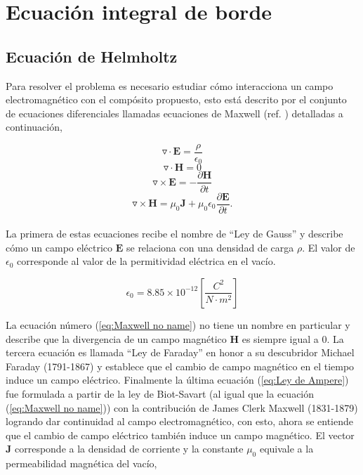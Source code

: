 \documentclass[12pt,letterpaper]{article}
\numberwithin{equation}{section}
\begin{document}
\section{Ecuación integral de borde}

\subsection{Ecuación de Helmholtz}
Para resolver el problema es necesario estudiar cómo interacciona un campo electromagnético con el compósito propuesto, esto está descrito por el conjunto de ecuaciones diferenciales llamadas ecuaciones de Maxwell (ref. \cite{Griffiths}) detalladas a continuación,

\begin{equation}
\triangledown\cdot\textbf{E} = \frac{\rho}{\epsilon_0}
\label{eq:Ley de Gauss}
\end{equation}
\begin{equation}
\triangledown\cdot\textbf{H} = 0
\label{eq:Maxwell no name}
\end{equation}
\begin{equation}
\triangledown\times\textbf{E} = -\frac{\partial\textbf{H}}{\partial t}
\label{eq:Ley de Faraday }
\end{equation}
\begin{equation}
\triangledown\times\textbf{H} = \mu_0 \textbf{J} + \mu_0\epsilon_0\frac{\partial\textbf{E}}{\partial t}.
\label{eq:Ley de Ampere}
\end{equation}
\\

La primera de estas ecuaciones recibe el nombre de ``Ley de Gauss'' y describe cómo un campo eléctrico $\textbf{E}$ se relaciona con una densidad de carga $\rho$. El valor de $\epsilon_0$ corresponde al valor de la permitividad eléctrica en el vacío.

$$\epsilon_0 = 8.85\times 10^{-12}\left[\frac{C^2}{N\cdot m^2}\right]$$

La ecuación número (\ref{eq:Maxwell no name}) no tiene un nombre en particular y describe que la divergencia de un campo magnético $\textbf{H}$ es siempre igual a $0$. La tercera ecuación es llamada ``Ley de Faraday'' en honor a su descubridor Michael Faraday (1791-1867) y establece que el cambio de campo magnético en el tiempo induce un campo eléctrico. Finalmente la última ecuación (\ref{eq:Ley de Ampere}) fue formulada a partir de la ley de Biot-Savart (al igual que la ecuación (\ref{eq:Maxwell no name})) con la contribución de James Clerk Maxwell (1831-1879) logrando dar continuidad al campo electromagnético, con esto, ahora se entiende que el cambio de campo eléctrico también induce un campo magnético. El vector $\textbf{J}$ corresponde a la densidad de corriente y la constante $\mu_0$ equivale a la permeabilidad magnética del vacío,
\end{document}
